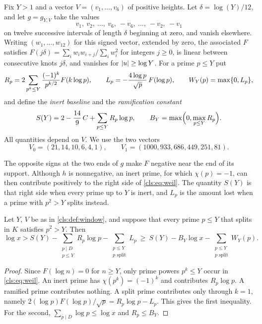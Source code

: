 \begin{definition}\label{cls:def:window}
Fix $Y>1$ and a vector $V=(v_1,\dots,v_6)$ of positive heights. Let $\delta=\log(Y)/12$,
and let $g=g_{Y,V}$ take the values
\[
  v_1,\ v_2,\ \dots,\ v_6,\ -v_6,\ \dots,\ -v_2,\ -v_1
\]
on twelve successive intervals of length $\delta$ beginning at zero, and vanish elsewhere.
Writing $(w_1,\dots,w_{12})$ for this signed vector, extended by zero, the associated $F$
satisfies $F(j\delta)=\sum_iw_iw_{i+j}/\sum_iw_i^2$ for integers $j\ge0$, is linear between
consecutive knots $j\delta$, and vanishes for $\lvert u\rvert\ge\log Y$. For a prime $p\le Y$ put
\[
 R_p=2\sum_{p^k\le Y}\frac{(-1)^k}{p^{k/2}}F(k\log p),\qquad
 L_p=-\frac{4\log p}{\sqrt p}\,F(\log p),\qquad W_Y(p)=\max\{0,L_p\},
\]
and define the \emph{inert baseline} and the \emph{ramification constant}
\[
 S(Y)=2-\frac{14}9\,C+\sum_{p\le Y}R_p\log p,\qquad
 B_Y=\max\Bigl(0,\max_{p\le Y}R_p\Bigr).
\]
All quantities depend on $V$. We use the two vectors
\[
 V_0=(21,14,10,6,4,1),\qquad V_1=(1000,933,686,449,251,81).
\]
\end{definition}

The opposite signs at the two ends of $g$ make $F$ negative near the end of its support.
Although $h$ is nonnegative, an inert prime, for which $\chi(p)=-1$, can then contribute
positively to the right side of \eqref{cls:eq:weil}. The quantity $S(Y)$ is that right
side when every prime up to $Y$ is inert, and $L_p$ is the amount lost when a prime with
$p^2>Y$ splits instead.

\begin{lemma}\label{cls:lem:baseline}
Let $Y$, $V$ be as in \cref{cls:def:window}, and suppose that every prime $p\le Y$ that
splits in $K$ satisfies $p^2>Y$. Then
\[
 \log x> S(Y)-\sum_{\substack{p\mid D\\ p\le Y}}R_p\log p
        -\sum_{\substack{p\le Y\\ p\text{ split}}}L_p
 \ \ge\ S(Y)-B_Y\log x-\sum_{\substack{p\le Y\\ p\text{ split}}}W_Y(p).
\]
\end{lemma}

\begin{proof}
Since $F(\log n)=0$ for $n\ge Y$, only prime powers $p^k\le Y$ occur in
\eqref{cls:eq:weil}. An inert prime has $\chi(p^k)=(-1)^k$ and contributes $R_p\log p$.
A ramified prime contributes nothing. A split prime contributes only through $k=1$, namely
$2(\log p)F(\log p)/\sqrt p=R_p\log p-L_p$. This gives the first inequality. For the
second, $\sum_{p\mid D}\log p\le\log x$ and $R_p\le B_Y$.
\end{proof}

